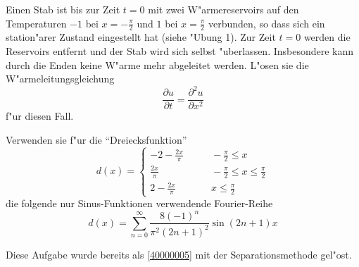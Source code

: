 Einen Stab ist bis zur Zeit $t=0$ mit zwei
W"armereservoirs auf den Temperaturen $-1$ bei $x=-\frac{\pi}2$ und
$1$ bei $x=\frac{\pi}2$ verbunden,
so dass sich ein station"arer Zustand eingestellt hat (siehe
"Ubung 1). Zur Zeit $t=0$ werden die Reservoirs entfernt und der
Stab wird sich selbst "uberlassen. Insbesondere kann durch die
Enden keine W"arme mehr abgeleitet werden. L"osen sie die
W"armeleitungsgleichung
\[
\frac{\partial u}{\partial t}=\frac{\partial^2 u}{\partial x^2}
\]
f"ur diesen Fall.

\begin{hinweis}
Verwenden sie f"ur die
``Dreiecksfunktion''
\[
d(x)
=
\begin{cases}
\displaystyle-2-\frac{2x}{\pi}&\qquad \displaystyle-\frac{\pi}2\le x\\
\displaystyle\frac{2x}{\pi}&\qquad \displaystyle-\frac{\pi}2\le x\le \frac{\pi}2\\
\displaystyle2-\frac{2x}{\pi}&\qquad \displaystyle x\le\frac{\pi}2
\end{cases}
\]
die folgende nur Sinus-Funktionen
verwendende Fourier-Reihe
\[
d(x)=\sum_{n=0}^\infty \frac{8(-1)^n}{\pi^2(2n+1)^2}\sin (2n+1)x
\]
\end{hinweis}

\begin{hinweis}
Diese Aufgabe wurde bereits als \ref{40000005} mit der Separationsmethode
gel"ost.
\end{hinweis}

